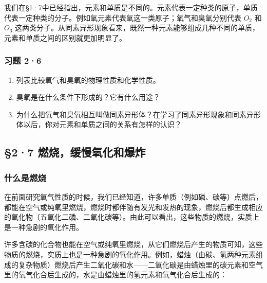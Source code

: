我们在§1·7中已经指出，元素和单质是不同的。元素代表一定种类的原子，单质代表一定种类的分子。例如氧元素代表氧这一类原子；氧气和臭氧分别代表
\(O_2\) 和 \(O_3\)
这两类分子。从同素异形现象看来，既然一种元素能够组成几种不同的单质，元素和单质之间的区别就更加明显了。

\subsubsection{习题 2·6}

\begin{enumerate}
\item
  列表比较氧气和臭氧的物理性质和化学性质。
\item
  臭氧是在什么条件下形成的？它有什么用途？
\item
  为什么把氧气和臭氧相互叫做同素异形体？在学习了同素异形现象和同素异形体以后，你对元素和单质之间的关系有怎样的认识？
\end{enumerate}

\subsection{§2·7 燃烧，缓慢氧化和爆炸}

\subsubsection{什么是燃烧}

在前面研究氧气性质的时候，我们已经知道，许多单质（例如磷、碳等）点燃后，都能在空气或纯氧里燃烧，燃烧时都伴随有发光和发热的现象，燃烧后都生成相应的氧化物（五氧化二磷、二氧化碳等）。由此可以看出，这些物质的燃烧，实质上是一种急剧的氧化作用。

许多含碳的化合物也能在空气或纯氧里燃烧，从它们燃烧后产生的物质可知，这些物质的燃烧，实质上也是一种急剧的氧化作用。例如，蜡烛（由碳、氢两种元素组成的复杂物质）燃烧后产生二氧化碳和水------二氧化碳是由蜡烛里的碳元素和空气里的氧气化合后生成的，水是由蜡烛里的氢元素和氧气化合后生成的：

\begin{figure}
\centering
{}

\end{figure}


